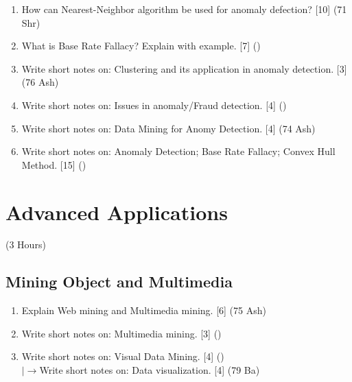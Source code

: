 \documentclass[12pt]{article}
\newcommand{\lb}{\\$\left|\rightarrow\right.$}
\begin{document}
\begin{enumerate}[topsep=0pt, noitemsep]
      \item How can Nearest-Neighbor algorithm be used for anomaly defection? \hfill [10] (71 Shr)

      \item What is Base Rate Fallacy? Explain with example. \hfill [7] ()

      \item Write short notes on: Clustering and its application in anomaly detection. \hfill [3] (76 Ash)

      \item Write short notes on: Issues in anomaly/Fraud detection. \hfill [4] ()

      \item Write short notes on: Data Mining for Anomy Detection. \hfill [4] (74 Ash)

      \item Write short notes on: Anomaly Detection; Base Rate Fallacy; Convex Hull Method. \hfill [15] ()
    \end{enumerate}

\pagebreak
\section{Advanced Applications}
\begin{center}(3 Hours)\end{center}

  \subsection{Mining Object and Multimedia}
    \begin{enumerate}[topsep=0pt, noitemsep]
      \item Explain Web mining and Multimedia mining. \hfill [6] (75 Ash)

      \item Write short notes on: Multimedia mining. \hfill [3] ()

      \item Write short notes on: Visual Data Mining. \hfill [4] ()
        \lb Write short notes on: Data visualization. \hfill [4] (79 Ba)
    \end{enumerate}
\end{document}

